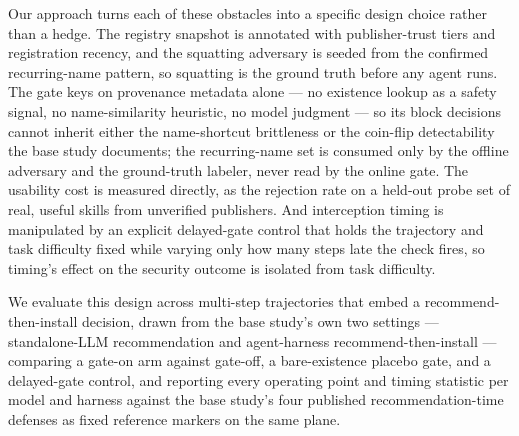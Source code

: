 \documentclass[11pt]{article}
\begin{document}
Our approach turns each of these obstacles into a specific design choice rather than a hedge. The registry snapshot is annotated with publisher-trust tiers and registration recency, and the squatting adversary is seeded from the confirmed recurring-name pattern, so squatting is the ground truth before any agent runs. The gate keys on provenance metadata alone --- no existence lookup as a safety signal, no name-similarity heuristic, no model judgment --- so its block decisions cannot inherit either the name-shortcut brittleness or the coin-flip detectability the base study documents; the recurring-name set is consumed only by the offline adversary and the ground-truth labeler, never read by the online gate. The usability cost is measured directly, as the rejection rate on a held-out probe set of real, useful skills from unverified publishers. And interception timing is manipulated by an explicit delayed-gate control that holds the trajectory and task difficulty fixed while varying only how many steps late the check fires, so timing's effect on the security outcome is isolated from task difficulty.

We evaluate this design across multi-step trajectories that embed a recommend-then-install decision, drawn from the base study's own two settings --- standalone-LLM recommendation and agent-harness recommend-then-install --- comparing a gate-on arm against gate-off, a bare-existence placebo gate, and a delayed-gate control, and reporting every operating point and timing statistic per model and harness against the base study's four published recommendation-time defenses as fixed reference markers on the same plane.
\end{document}

